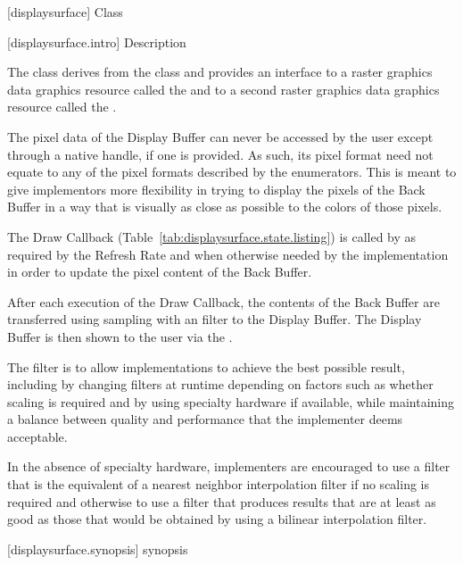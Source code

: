  [displaysurface] {Class }

 [displaysurface.intro] { Description}

\pnum
{}
The class  derives from the  class and provides an interface to a raster graphics data graphics resource called the  and to a second raster graphics data graphics resource called the .

\pnum
The pixel data of the Display Buffer can never be accessed by the user except through a native handle, if one is provided. As such, its pixel format need not equate to any of the pixel formats described by the  enumerators. This is meant to give implementors more flexibility in trying to display the pixels of the Back Buffer in a way that is visually as close as possible to the colors of those pixels.

\pnum
The Draw Callback (Table~\ref{tab:displaysurface.state.listing}) is called by  as required by the Refresh Rate and when otherwise needed by the implementation in order to update the pixel content of the Back Buffer.

\pnum
After each execution of the Draw Callback, the contents of the Back Buffer are transferred using sampling with an \unspecnorm filter to the Display Buffer. The Display Buffer is then shown to the user via the .
\begin{note}
The filter is \unspecnorm to allow implementations to achieve the best possible result, including by changing filters at runtime depending on factors such as whether scaling is required and by using specialty hardware if available, while maintaining a balance between quality and performance that the implementer deems acceptable.

In the absence of specialty hardware, implementers are encouraged to use a filter that is the equivalent of a nearest neighbor interpolation filter if no scaling is required and otherwise to use a filter that produces results that are at least as good as those that would be obtained by using a bilinear interpolation filter.
\end{note}

 [displaysurface.synopsis] { synopsis}

